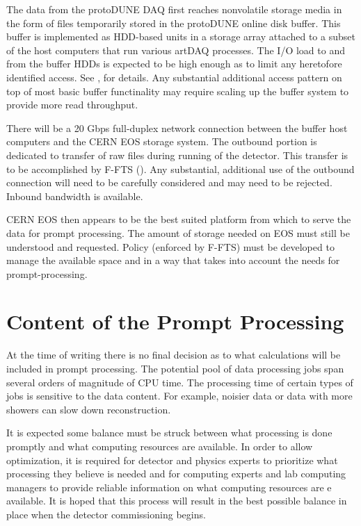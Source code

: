 \documentclass[pdftex,12pt,letter]{article}
\newcommand{\pd}{protoDUNE\xspace}
\begin{document}
The data from the \pd DAQ first reaches nonvolatile storage media in the form of files temporarily
stored in the \pd online disk buffer. This buffer is implemented as HDD-based units in a storage array
attached to a subset of the host computers that run various artDAQ
processes.  The I/O load to and from the buffer HDDs is expected to be
high enough as to limit any heretofore identified access.  See
\cite{docdb1086},\cite{docdb1212} for details.  Any substantial
additional access pattern on top of most basic buffer functinality may require
scaling up  the buffer system to provide more read throughput.

There will be a 20 Gbps full-duplex network connection between the
buffer host computers and the CERN EOS storage system.  The outbound
portion is dedicated to transfer of raw files during running of the
detector.  This transfer is to be accomplished by F-FTS
(\cite{docdb1212}).  Any substantial, additional use of the outbound connection will need to be
carefully considered and may need to be rejected.  Inbound bandwidth
is available.

CERN EOS then appears to be the best suited platform from which to
serve the data for prompt processing.  The amount of storage needed on
EOS must still be understood and requested.  Policy (enforced by
F-FTS) must be developed to manage the available space and in a way
that takes into account the needs for prompt-processing.



\section{Content of the Prompt Processing}
At the time of writing there is no final decision as to what calculations will be included in prompt processing.
The potential pool of data processing jobs span several orders of magnitude of CPU time.
The processing time of certain types of jobs is sensitive to the data content.  
For example, noisier data or data with more showers can slow down reconstruction.

It is expected some balance must be struck between what processing is
done promptly and what computing resources are available.  In order to
allow optimization, it is required for detector and physics experts to
prioritize what processing they believe is needed and for computing
experts and lab computing managers to provide reliable information on
what computing resources are e available. It is hoped that this process
will result in the best possible balance in place when
the detector commissioning begins.
\end{document}
